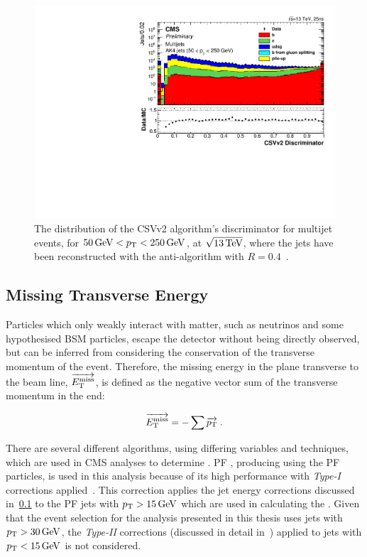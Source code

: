 \begin{figure}[h]
\centering
\includegraphics{figs/data-mc/ak4_pfjets_CSVIVF_Log.pdf}
\caption{The distribution of the CSVv2 algorithm's discriminator for multijet events, for $50\,\text{Ge\hspace{-.08em}V} < p_{\mathrm{T}} < 250\,\text{Ge\hspace{-.08em}V}$, at $\sqrt{13\,\text{Te\hspace{-.08em}V}}$, where the jets have been reconstructed with the anti-\kt algorithm with $R = 0.4$~\cite{CMS:2016kkf}.}
\label{fig:bTagDiscriminator}
\end{figure}

\subsection{Missing Transverse Energy}
Particles which only weakly interact with matter, such as neutrinos and some hypothesised BSM particles, escape the detector without being directly observed, but can be inferred from considering the conservation of the transverse momentum of the event.
Therefore, the missing energy in the plane transverse to the beam line, $\overrightarrow{E_{\mathrm{T}}^{\text{miss}}}$, is defined as the negative vector sum of the transverse momentum in the end:

\begin{equation}
\overrightarrow{E_{\mathrm{T}}^{\text{miss}}} = - \sum \overrightarrow{p_{\mathrm{T}}} \;.
\label{eq:MET}
\end{equation}

There are several different algorithms, using differing variables and techniques, which are used in CMS analyses to determine \MET.
PF \MET, producing using the PF particles, is used in this analysis because of its high performance with \emph{Type-I} \MET corrections applied~\cite{CMS:2016ljj}.
This correction applies the jet energy corrections discussed in~\ref{} to the PF jets with $p_{\mathrm{T}} >15\,\text{Ge\hspace{-.08em}V}$ which are used in calculating the \MET.
Given that the event selection for the analysis presented in this thesis uses jets with $p_{\mathrm{T}} > 30\,\text{Ge\hspace{-.08em}V}$, the \emph{Type-II} corrections (discussed in detail in~\cite{Chatrchyan:2011tn}) applied to jets with $p_{\mathrm{T}} < 15\,\text{Ge\hspace{-.08em}V}$ is not considered.
